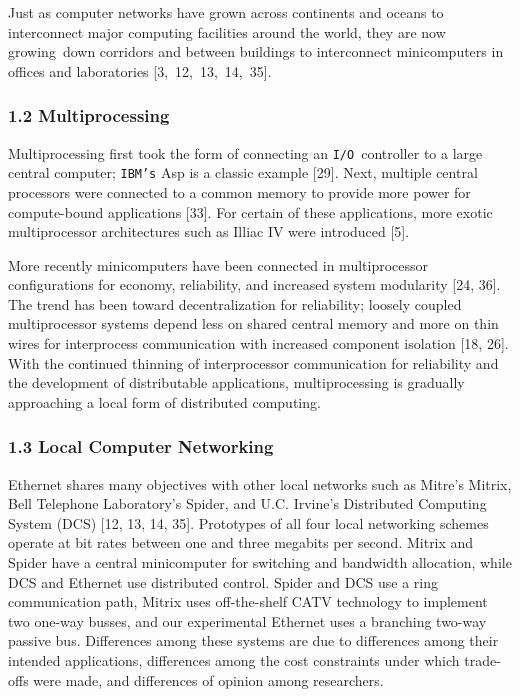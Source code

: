 Just as computer networks have grown across continents and oceans to interconnect major computing facilities around the world, they are now growing~down corridors and between buildings to interconnect minicomputers in offices and laboratories [3,~12,~13,~14,~35].

\vspace{-10pt}
\subsubsection{1.2 Multiprocessing}
\vspace{-5pt}

Multiprocessing first took the form of connecting an \small{\texttt{I/O}}~controller to a large central computer; \texttt{IBM's} Asp  is a %
classic example [29]. Next, multiple central processors were connected to a common memory to provide more power for compute-bound applications [33]. For certain of these applications, more exotic multiprocessor architectures such as Illiac IV were introduced [5].

More recently minicomputers have been connected in multiprocessor configurations for economy, reliability, and increased system modularity [24, 36]. The trend has been toward decentralization for reliability; loosely coupled multiprocessor systems depend less on shared central memory and more on thin wires for interprocess communication with increased component isolation [18, 26]. With the continued thinning of interprocessor communication for reliability and the development of distributable applications, multiprocessing
is gradually approaching a local form of distributed computing.

\vspace{-10pt}
\subsubsection{1.3 Local Computer Networking}
\vspace{-5pt}

Ethernet shares many objectives with other local networks such as Mitre's Mitrix, Bell Telephone Laboratory's Spider, and U.C. Irvine's Distributed Computing System (DCS) [12, 13, 14, 35]. Prototypes of all four local networking schemes operate at bit rates between one and three megabits per second. Mitrix and Spider have a central minicomputer for switching and bandwidth allocation, while DCS and Ethernet use distributed control. Spider and DCS use a ring communication path, Mitrix uses off-the-shelf CATV technology to implement two one-way busses, and our experimental Ethernet uses a branching two-way passive bus. Differences among these systems are due to differences among their intended applications, differences among the cost constraints under which trade-offs were made, and differences of opinion among researchers.

